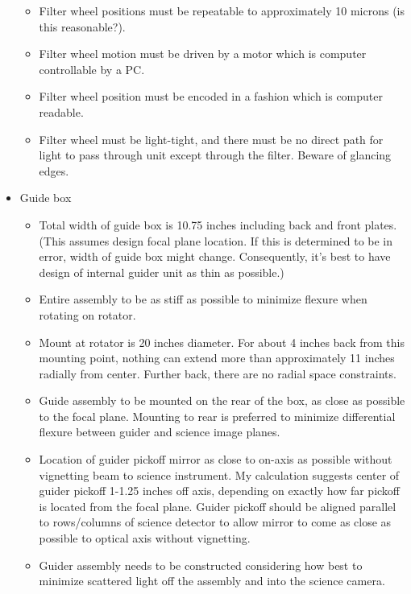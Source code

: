 \documentclass{report}[12pt]
\begin{document}
\begin{itemize}
\begin{itemize}
\item Filter wheel positions must be repeatable to approximately 10 microns
(is this reasonable?).

\item Filter wheel motion must be driven by a motor which is computer
controllable by a PC.

\item Filter wheel position must be encoded in a fashion which is computer
readable.

\item Filter wheel must be light-tight, and there must be no direct path
for light to pass through unit except through the filter. Beware of
glancing edges.

\end{itemize}

\item Guide box
\begin{itemize}
\item Total width of guide box is 10.75 inches including back and front
plates. (This assumes design focal plane location. If this is determined
to be in error, width of guide box might change. Consequently, it's best
to have design of internal guider unit as thin as possible.)

\item Entire assembly to be as stiff as possible to minimize flexure when
rotating on rotator.

\item Mount at rotator is 20 inches diameter. For about 4 inches back from
this mounting point, nothing can extend more than approximately 11 inches
radially from center. Further back, there are no radial space constraints.

\item Guide assembly to be mounted on the rear of the box, as close as
possible to the focal plane. Mounting to rear is preferred to minimize
differential flexure between guider and science image planes.

\item Location of guider pickoff mirror as close to on-axis as possible
without vignetting beam to science instrument. My calculation suggests
center of guider pickoff 1-1.25 inches off axis, depending on exactly
how far pickoff is located from the focal plane. Guider pickoff should
be aligned parallel to rows/columns of science detector to allow mirror
to come as close as possible to optical axis without vignetting.

\item Guider assembly needs to be constructed considering how best to
minimize scattered light off the assembly and into the science camera.


\end{itemize}
\end{itemize}
\end{document}
